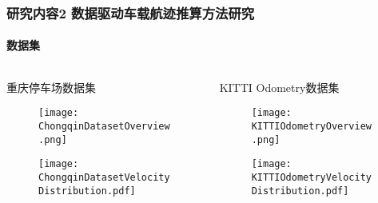 \begin{frame}[t] 
 	\frametitle{研究内容2 数据驱动车载航迹推算方法研究}
 	\framesubtitle{数据集}
 	\vspace{-0.4cm}
	\begin{columns}[t]
		\begin{column}{0.5\textwidth}
            重庆停车场数据集
		   	\begin{figure}
    			\texttt{[image: ChongqinDatasetOverview.png]}
		   	\end{figure}
		   	\vspace{-0.5cm}
		   	\begin{figure}
				\texttt{[image: ChongqinDatasetVelocityDistribution.pdf]}
		   	\end{figure}   
		\end{column}   
		\begin{column}{0.5\textwidth}
		    KITTI Odometry数据集
		   	\begin{figure}
                \texttt{[image: KITTIOdometryOverview.png]}
		   	\end{figure}
		   	\vspace{-0.5cm} 
		   	\begin{figure}
				\texttt{[image: KITTIOdometryVelocityDistribution.pdf]}
		   	\end{figure}  
		\end{column}
	\end{columns}
\end{frame}

